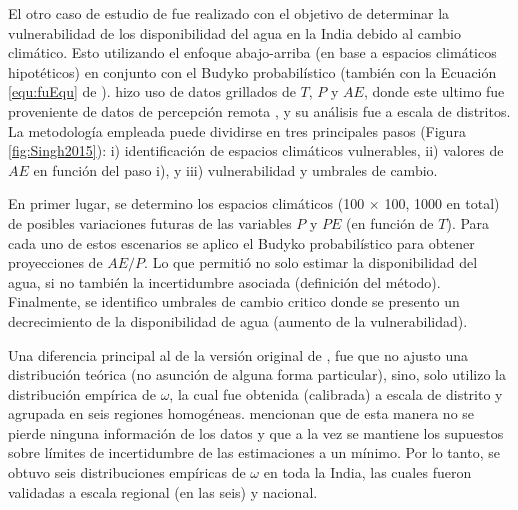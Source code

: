 \documentclass[12pt]{article}
\begin{document}
\clearpage


El otro caso de estudio de \citet{Singh2015} fue realizado con el objetivo de determinar la vulnerabilidad de los disponibilidad del agua en la India debido al cambio climático. Esto utilizando el enfoque abajo-arriba (en base a espacios climáticos hipotéticos) en conjunto con el Budyko probabilístico (también con la Ecuación \ref{equ:fuEqu} de \citet{Fu1981}). \citet{Singh2015} hizo uso de datos grillados de $T$, $P$ y $AE$, donde este ultimo fue proveniente de datos de percepción remota \citep{zhang2016review}, y su análisis fue a escala de distritos. La metodología empleada puede dividirse en tres principales pasos (Figura \ref{fig:Singh2015}): i) identificación de espacios climáticos vulnerables, ii) valores de $AE$ en función del paso i), y iii) vulnerabilidad y umbrales de cambio. 

\thispagestyle{empty}



En primer lugar, se determino los espacios climáticos (100 $\times$ 100, 1000 en total) de posibles variaciones futuras de las variables $P$ y $PE$ (en función de $T$). Para cada uno de estos escenarios se aplico el Budyko probabilístico para obtener proyecciones de $AE/P$. Lo que permitió no solo estimar la disponibilidad del agua, si no también la incertidumbre asociada (definición del método). Finalmente, se identifico umbrales de cambio critico donde se presento un decrecimiento de la disponibilidad de agua (aumento de la vulnerabilidad).

\thispagestyle{empty}

Una diferencia principal al de la versión original de \citet{Greve2015}, fue que \citet{Singh2015} no ajusto una distribución teórica (no asunción de alguna forma particular), sino, solo utilizo la distribución empírica de $\omega$, la cual fue obtenida (calibrada) a escala de distrito y agrupada en seis regiones homogéneas. \citet{Singh2015} mencionan que de esta manera no se pierde ninguna información de los datos y que a la vez se mantiene los supuestos sobre límites de incertidumbre de las estimaciones a un mínimo. Por lo tanto, se obtuvo seis distribuciones empíricas de $\omega$ en toda la India, las cuales fueron validadas a escala regional (en las seis) y nacional.
\end{document}
